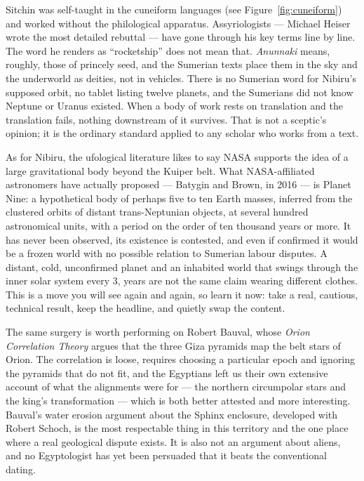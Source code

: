 
Sitchin was self-taught in the cuneiform languages (see Figure~\ref{fig:cuneiform}) and worked without the philological apparatus. Assyriologists ---
Michael Heiser wrote the most detailed rebuttal --- have gone through his key terms line by line.
The word he renders as ``rocketship'' does not mean that. \emph{Anunnaki} means, roughly,
those of princely seed, and the Sumerian texts place them in the sky and the underworld as deities,
not in vehicles. There is no Sumerian word for Nibiru's supposed orbit, no tablet listing twelve
planets, and the Sumerians did not know Neptune or Uranus existed. When a body of work rests on
translation and the translation fails, nothing downstream of it survives. That is not a
sceptic's opinion; it is the ordinary standard applied to any scholar who works from a text.

As for Nibiru, the ufological literature likes to say NASA supports the idea of a large
gravitational body beyond the Kuiper belt. What NASA-affiliated astronomers have actually
proposed --- Batygin and Brown, in 2016 --- is Planet Nine: a hypothetical body of perhaps five to
ten Earth masses, inferred from the clustered orbits of distant trans-Neptunian objects, at
several hundred astronomical units, with a period on the order of ten thousand years or more. It
has never been observed, its existence is contested, and even if confirmed it would be a frozen
world with no possible relation to Sumerian labour disputes. A distant, cold, unconfirmed planet
and an inhabited world that swings through the inner solar system every 3, years are not the
same claim wearing different clothes. This is a move you will see again and again, so learn it
now: take a real, cautious, technical result, keep the headline, and quietly swap the content.

The same surgery is worth performing on Robert Bauval, whose \emph{Orion Correlation Theory} argues
that the three Giza pyramids map the belt stars of Orion. The correlation is loose, requires
choosing a particular epoch and ignoring the pyramids that do not fit, and the Egyptians left us
their own extensive account of what the alignments were for --- the northern circumpolar stars and
the king's transformation --- which is both better attested and more interesting. Bauval's water
erosion argument about the Sphinx enclosure, developed with Robert Schoch, is the most respectable
thing in this territory and the one place where a real geological dispute exists. It is also not an
argument about aliens, and no Egyptologist has yet been persuaded that it beats the conventional
dating.


